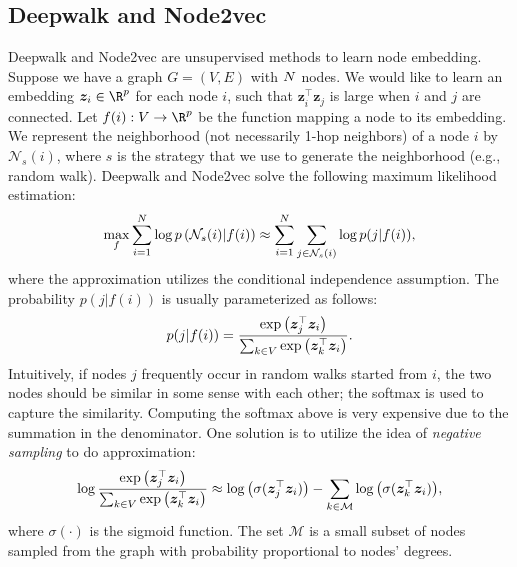 \subsection{Deepwalk and Node2vec}
    Deepwalk and Node2vec are unsupervised methods to learn node embedding.
    Suppose we have a graph $G=(V, E)$ with $N$ nodes.
    We would like to learn an embedding $\bm{z}_i \in \R^\nfeat$ for each node $i$, such that $\bm{z}^{\top}_i \bm{z}_j$ is large when $i$ and $j$ are connected.
    Let $f(i): V \rightarrow \R^\nfeat$ be the function mapping a node to its embedding.
    We represent the neighborhood (not necessarily 1-hop neighbors) of a node $i$ by $\mathcal{N}_{s}(i)$, where $s$ is the  strategy that we use to generate the neighborhood (e.g., random walk).
    Deepwalk and Node2vec solve the following maximum likelihood estimation:
        \begin{equation}
            \max_{f} \sum_{i=1}^{N}{ \log p\left(\mathcal{N}_s(i) | f(i) \right)} \approx \sum_{i=1}^{N}{ \sum_{j \in \mathcal{N}_s(i)}^{}{\log p(j | f(i))} },
        \end{equation}
    where the approximation utilizes the conditional independence assumption.
    The probability $p(j | f(i))$ is usually parameterized as follows:
        \begin{equation}
            p(j | f(i)) = \frac{ \text{exp}\left( \bm{z}_j^\top \bm{z}_i \right) }{\sum_{k\in V}^{}{ \text{exp}\left( \bm{z}_k^\top \bm{z}_i \right) }}.
        \end{equation}
    Intuitively, if nodes $j$ frequently occur in random walks started from $i$, the two nodes should be similar in some sense with each other; the softmax is used to capture the similarity.
    Computing the softmax above is very expensive due to the summation in the denominator.
    One solution is to utilize the idea of \emph{negative sampling} to do approximation:
        \begin{equation}
            \log \frac{ \text{exp}\left( \bm{z}_j^\top \bm{z}_i \right) }{\sum_{k\in V}^{}{ \text{exp}\left( \bm{z}_k^\top \bm{z}_i \right) }} \approx \log\left( \sigma(\bm{z}_j^\top \bm{z}_i) \right)  - \sum_{k\in \mathcal{M}}^{}{\log\left( \sigma(\bm{z}_k^\top \bm{z}_i) \right)},
        \end{equation}
    where $\sigma(\cdot)$ is the sigmoid function.
    The set $\mathcal{M}$ is a small subset of nodes sampled from the graph with probability proportional to nodes' degrees. 
    
    
